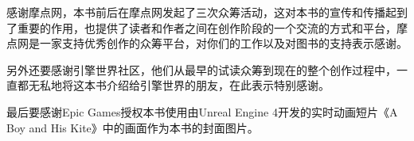感谢摩点网，本书前后在摩点网发起了三次众筹活动，这对本书的宣传和传播起到了重要的作用，也提供了读者和作者之间在创作阶段的一个交流的方式和平台，摩点网是一家支持优秀创作的众筹平台，对你们的工作以及对图书的支持表示感谢。

另外还要感谢引擎世界社区，他们从最早的试读众筹到现在的整个创作过程中，一直都无私地将这本书介绍给引擎世界的朋友，在此表示特别感谢。

最后要感谢Epic Games授权本书使用由Unreal Engine 4开发的实时动画短片《A Boy and His Kite》中的画面作为本书的封面图片。

	

\vspace{\baselineskip}
\vspace{\baselineskip}
\begin{flushright}\noindent
\hfill {\it }\\
 \hfill {\it }\\
\end{flushright}


\vspace{\baselineskip}
\vspace{\baselineskip}
\vspace{\baselineskip}


